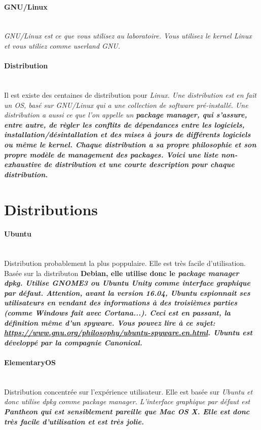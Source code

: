 \documentclass[12pt,oneside,final]{article}
\begin{document}
\paragraph{GNU/Linux} ~ \\ \it{GNU/Linux} est ce que vous utilisez au
laboratoire. Vous utilisez le \it{kernel Linux} et vous utiliez comme
\it{userland GNU}.


\paragraph{Distribution} ~ \\ Il est existe des centaines de
distribution pour \it{Linux}. Une distribution est en fait un OS, basé
sur \it{GNU/Linux} qui a une collection de \it{software}
pré-installé. Une distribution a aussi ce que l'on appelle un
\bf{package manager}, qui s'assure, entre autre, de règler les
conflits de dépendances entre les logiciels,
installation/désintallation et des mises à jours de différents
logiciels ou même le \it{kernel}. Chaque distribution a sa propre
philosophie et son propre modèle de management des
\it{packages}. Voici une liste non-exhaustive de distribution et une
courte description pour chaque distribution.



\newpage \section{Distributions}

\paragraph{Ubuntu} ~ \\
Distribution probablement la plus poppulaire. Elle est très facile
d'utilisation. Basée sur la distributon \bf{Debian}, elle utilise
donc le \it{package manager} \bf{dpkg}. Utilise \bf{GNOME3} ou
\bf{Ubuntu Unity} comme interface graphique par
défaut. \bf{Attention}, avant la version \bf{16.04}, \it{Ubuntu}
espionnait ses utilisateurs en vendant des informations à des
troisièmes parties (comme Windows fait avec Cortana...). Ceci est en
passant, la définition même d'un \it{spyware}. Vous pouvez lire à ce
sujet:
\url{https://www.gnu.org/philosophy/ubuntu-spyware.en.html}. \it{Ubuntu}
est développé par la compagnie \bf{Canonical}.


\paragraph{ElementaryOS} ~ \\
Distribution concentrée sur l'expérience utilisateur. Elle est basée
sur \it{Ubuntu} et donc utilise \it{dpkg} comme \it{package
  manager}. L'interface graphique par défaut est \bf{Pantheon} qui
est sensiblement pareille que \bf{Mac OS X}. Elle est donc très
facile d'utilisation et est très jolie.
\end{document}

